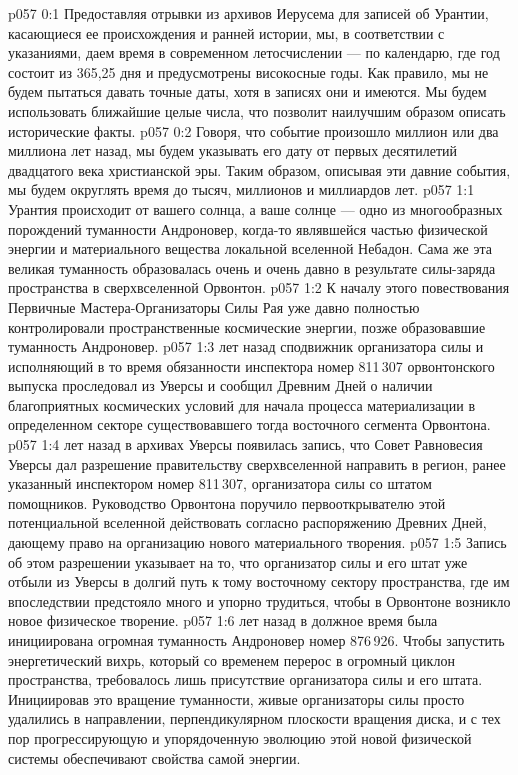 \author{Носитель Жизни}
\vs p057 0:1 Предоставляя отрывки из архивов Иерусема для записей об Урантии, касающиеся ее происхождения и ранней истории, мы, в соответствии с указаниями, даем время в современном летосчислении --- по календарю, где год состоит из 365,25 дня и предусмотрены високосные годы. Как правило, мы не будем пытаться давать точные даты, хотя в записях они и имеются. Мы будем использовать ближайшие целые числа, что позволит наилучшим образом описать исторические факты.
\vs p057 0:2 Говоря, что событие произошло миллион или два миллиона лет назад, мы будем указывать его дату от первых десятилетий двадцатого века христианской эры. Таким образом, описывая эти давние события, мы будем округлять время до тысяч, миллионов и миллиардов лет.
\vs p057 1:1 Урантия происходит от вашего солнца, а ваше солнце --- одно из многообразных порождений туманности Андроновер, когда\hyp{}то являвшейся частью физической энергии и материального вещества локальной вселенной Небадон. Сама же эта великая туманность образовалась очень и очень давно в результате силы\hyp{}заряда пространства в сверхвселенной Орвонтон.
\vs p057 1:2 К началу этого повествования Первичные Мастера\hyp{}Организаторы Силы Рая уже давно полностью контролировали пространственные космические энергии, позже образовавшие туманность Андроновер.
\vs p057 1:3 \pc {} лет назад сподвижник организатора силы и исполняющий в то время обязанности инспектора номер 811\,307 орвонтонского выпуска проследовал из Уверсы и сообщил Древним Дней о наличии благоприятных космических условий для начала процесса материализации в определенном секторе существовавшего тогда восточного сегмента Орвонтона.
\vs p057 1:4 \pc {} лет назад в архивах Уверсы появилась запись, что Совет Равновесия Уверсы дал разрешение правительству сверхвселенной направить в регион, ранее указанный инспектором номер 811\,307, организатора силы со штатом помощников. Руководство Орвонтона поручило первооткрывателю этой потенциальной вселенной действовать согласно распоряжению Древних Дней, дающему право на организацию нового материального творения.
\vs p057 1:5 Запись об этом разрешении указывает на то, что организатор силы и его штат уже отбыли из Уверсы в долгий путь к тому восточному сектору пространства, где им впоследствии предстояло много и упорно трудиться, чтобы в Орвонтоне возникло новое физическое творение.
\vs p057 1:6 \pc {} лет назад в должное время была инициирована огромная туманность Андроновер номер 876\,926. Чтобы запустить энергетический вихрь, который со временем перерос в огромный циклон пространства, требовалось лишь присутствие организатора силы и его штата. Инициировав это вращение туманности, живые организаторы силы просто удалились в направлении, перпендикулярном плоскости вращения диска, и с тех пор прогрессирующую и упорядоченную эволюцию этой новой физической системы обеспечивают свойства самой энергии.
